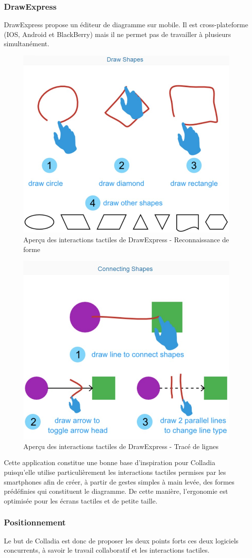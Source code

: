 \subsubsection{DrawExpress}
DrawExpress propose un éditeur de diagramme sur mobile.
Il est cross-plateforme (IOS, Android et BlackBerry) mais il ne permet pas de travailler à plusieurs simultanément.

\vspace*{\fill}
\begin{figure}[!h]
	\centering
	\includegraphics[width=.4\textwidth]{img/DrawExpressRecognition}
	\caption{Aperçu des interactions tactiles de DrawExpress - Reconnaissance de forme}
\end{figure}
\vspace*{\fill}

\newpage
\begin{figure}[!h]
	\centering
	\includegraphics[width=.4\textwidth]{img/DrawExpressLinks}
	\caption{Aperçu des interactions tactiles de DrawExpress - Tracé de lignes}
\end{figure}

Cette application constitue une bonne base d'inspiration pour Colladia puisqu'elle  utilise particulièrement les interactions tactiles permises par les smartphones afin de créer, à partir de gestes simples à main levée, des formes prédéfinies qui constituent le diagramme.
De cette manière, l'ergonomie est optimisée pour les écrans tactiles et de petite taille.

\subsubsection{Positionnement}
Le but de Colladia est donc de proposer les deux points forts ces deux logiciels concurrents, à savoir le travail collaboratif et les interactions tactiles.

